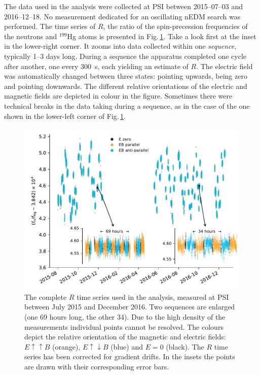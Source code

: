 The data used in the analysis were collected at PSI between 2015--07--03 and 2016--12--18.
No measurement dedicated for an oscillating nEDM search was performed.
The time series of $R$, the ratio of the spin-precession frequencies of the neutrons and ${}^{199}$Hg atoms is presented in Fig.\,\ref{fig:PSI_dataset_time_domain}.
Take a look first at the inset in the lower-right corner.
It zooms into data collected within one \emph{sequence}, typically 1--3 days long.
During a sequence the apparatus completed one cycle after another, one every \SI{300}{\second}, each yielding an estimate of $R$.
The electric field was automatically changed between three states: pointing upwards, being zero and pointing downwards.
The different relative orientations of the electric and magnetic fields are depicted in colour in the figure.
Sometimes there were technical breaks in the data taking during a sequence, as in the case of the one shown in the lower-left corner of Fig.\,\ref{fig:PSI_dataset_time_domain}.

\begin{figure}
  \centering
  \includegraphics[width=\linewidth]{gfx/axions/deltah4mm_time_domain_inset_no_yerr.pdf}
  \caption{The complete $R$ time series used in the analysis, measured at PSI between July 2015 and December 2016.
  Two sequences are enlarged (one 69 hours long, the other 34).
  Due to the high density of the measurements individual points cannot be resolved.
  The colours depict the relative orientation of the magnetic and electric fields: $E \uparrow \uparrow B$ (orange), $E \uparrow \downarrow B$ (blue) and $E=0$ (black).
  The $R$ time series has been corrected for gradient drifts.
  In the insets the points are drawn with their corresponding error bars.}\label{fig:PSI_dataset_time_domain}
\end{figure}

